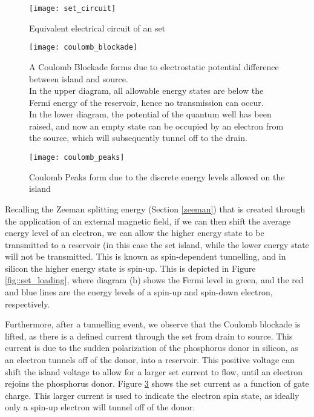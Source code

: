	\begin{figure}[htbp!]
		\centering
		\texttt{[image: set\_circuit]}
		\caption[Equivalent circuit of an \gls{set}]{Equivalent electrical circuit of an \gls{set}\cite{devoret2000amplifying}}
		\label{fig::set_circuit}
	\end{figure}
	
	\begin{figure}[htbp!]
		\centering
		\texttt{[image: coulomb\_blockade]}
		\caption[A Coulomb Blockade]{A Coulomb Blockade \cite{coulomb_blockade} forms due to electrostatic potential difference between island and source.\\ In the upper diagram, all allowable energy states are below the Fermi energy of the reservoir, hence no transmission can occur.\\ In the lower diagram, the potential of the quantum well has been raised, and now an empty state can be occupied by an electron from the source, which will subsequently tunnel off to the drain.}
		\label{fig::coulomb_blockade}
	\end{figure}
	
	\begin{figure}[htbp!]
		\centering
		\texttt{[image: coulomb\_peaks]}
		\caption[Coulomb Peaks]{Coulomb Peaks form due to the discrete energy levels allowed on the island\cite{elec9705_lecture}}
		\label{fig::coulomb_peaks}
	\end{figure}
	
	
	
	Recalling the Zeeman splitting energy (Section \ref{zeeman}) that is created through the application of an external magnetic field, if we can then shift the average energy level of an electron, we can allow the higher energy state to be transmitted to a reservoir (in this case the \gls{set} island, while the lower energy state will not be transmitted. This is known as spin-dependent tunnelling, and in silicon the higher energy state is spin-up. This is depicted in Figure \ref{fig::set_loading}, where diagram (b) shows the Fermi level in green, and the red and blue lines are the energy levels of a spin-up and spin-down electron, respectively. 
	
	Furthermore, after a tunnelling event, we observe that the Coulomb blockade is lifted, as there is a defined current through the \gls{set} from drain to source. This current is due to the sudden polarization of the phosphorus donor in silicon, as an electron tunnels off of the donor, into a reservoir. This positive voltage can shift the island voltage to allow for a larger \gls{set} current to flow, until an electron rejoins the phosphorus donor. Figure \ref{fig::coulomb_peaks} shows the \gls{set} current as a function of gate charge. This larger current is used to indicate the electron spin state, as ideally only a spin-up electron will tunnel off of the donor.
	
